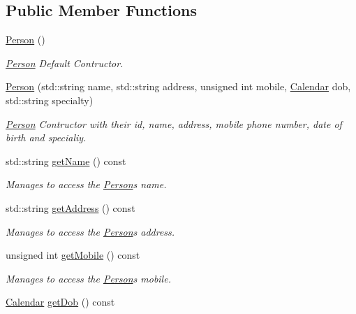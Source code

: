 \subsection*{Public Member Functions}
\begin{DoxyCompactItemize}
\item 
\mbox{\label{class_person_a0397c6f89fafc12e738923f612bc41a3}} 
\hyperlink{class_person_a0397c6f89fafc12e738923f612bc41a3}{Person} ()
\begin{DoxyCompactList}\small\item\em \hyperlink{class_person}{Person} Default Contructor. \end{DoxyCompactList}\item 
\hyperlink{class_person_aebae0cd39e3484b689f903fb08c75b45}{Person} (std\+::string name, std\+::string address, unsigned int mobile, \hyperlink{class_calendar}{Calendar} dob, std\+::string specialty)
\begin{DoxyCompactList}\small\item\em \hyperlink{class_person}{Person} Contructor with their id, name, address, mobile phone number, date of birth and specialiy. \end{DoxyCompactList}\item 
std\+::string \hyperlink{class_person_a9db2e2ccfc6cfa0d7979613ec2aaa922}{get\+Name} () const
\begin{DoxyCompactList}\small\item\em Manages to access the \hyperlink{class_person}{Person}\textquotesingle{}s name. \end{DoxyCompactList}\item 
std\+::string \hyperlink{class_person_a5679891e504c02313654d2340953004b}{get\+Address} () const
\begin{DoxyCompactList}\small\item\em Manages to access the \hyperlink{class_person}{Person}\textquotesingle{}s address. \end{DoxyCompactList}\item 
unsigned int \hyperlink{class_person_aac79622064676ce915e2caff620f9af4}{get\+Mobile} () const
\begin{DoxyCompactList}\small\item\em Manages to access the \hyperlink{class_person}{Person}\textquotesingle{}s mobile. \end{DoxyCompactList}\item 
\hyperlink{class_calendar}{Calendar} \hyperlink{class_person_a5ce9adf0875eee7cf702716be85c9d61}{get\+Dob} () const

\end{DoxyCompactItemize}
